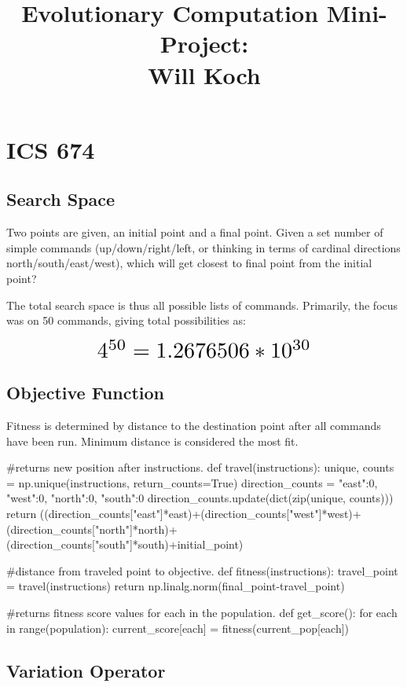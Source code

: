 \documentclass{article}
\title{Evolutionary Computation Mini-Project: \protect\\ Will Koch}
\begin{document}
\maketitle
\section{ICS 674}


\subsection{Search Space}

Two points are given, an initial point and a final point. Given a set number of simple commands
 (up/down/right/left, or thinking in terms of cardinal directions north/south/east/west), which will get closest to final point from the initial point?

The total search space is thus all possible lists of commands. Primarily, the focus was on 50 commands, giving total possibilities as:

\[ \scalebox{2}{$4^{50} = 1.2676506 * 10^{30}$} \]


\subsection{Objective Function}

Fitness is determined by distance to the destination point after all commands have been run. Minimum distance is considered the most fit. 


\begin{python}
#returns new position after instructions.
def travel(instructions): 
	unique, counts = np.unique(instructions, return_counts=True)
	direction_counts = {"east":0, "west":0, "north":0, "south":0}
	direction_counts.update(dict(zip(unique, counts)))
	return ((direction_counts["east"]*east)+(direction_counts["west"]*west)+(direction_counts["north"]*north)+(direction_counts["south"]*south)+initial_point)

#distance from traveled point to objective.
def fitness(instructions):
	travel_point = travel(instructions)
	return np.linalg.norm(final_point-travel_point)

#returns fitness score values for each in the population.
def get_score():
	for each in range(population):
		current_score[each] = fitness(current_pop[each])
\end{python}

\subsection{Variation Operator}
\end{document}
